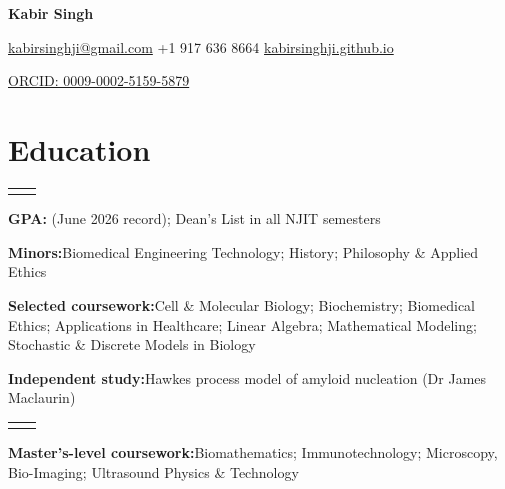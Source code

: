 \documentclass[a4paper,11pt]{article}
\makeatletter
\newcommand{\cvsection}[1]{\Needspace{4\baselineskip}\section*{#1}}
\newcommand{\entry}[4]{%
  \Needspace{4\baselineskip}%
  \begin{tabularx}{\linewidth}{@{}>{\raggedright\arraybackslash}X
    >{\raggedleft\arraybackslash}p{33mm}@{}}%
    \textbf{#1} & {\small #2}\\%
    \multicolumn{2}{@{}p{\linewidth}@{}}{{\small #3\if\relax\detokenize{#4}\relax\else\enspace|\enspace #4\fi}}%
  \end{tabularx}\par
}
\newcommand{\detail}[2]{\textbf{#1}\enspace #2\par}
\newcommand{\gap}{\vspace{3pt}}
\makeatother
\begin{document}
\begin{center}
  {\fontsize{23}{25}\selectfont\bfseries Kabir Singh}\par
  \vspace{3pt}
  {\small
    \href{mailto:kabirsinghji@gmail.com}{kabirsinghji@gmail.com}
    \enspace\textbar\enspace +1 917 636 8664
    \enspace\textbar\enspace
    \href{https://kabirsinghji.github.io}{kabirsinghji.github.io}}\par
  \vspace{1pt}
  {\small \href{https://orcid.org/0009-0002-5159-5879}{ORCID: 0009-0002-5159-5879}}
\end{center}
\vspace{-6pt}


\cvsection{Education}
\entry{B.S. Mathematical Sciences (Mathematical Biology)}
  {Sep 2023 -- May 2027}
  {Albert Dorman Honors College, New Jersey Institute of Technology (NJIT)}
  {Newark, NJ, USA}
{\small
  \detail{GPA:}{3.60 (June 2026 record); Dean's List in all NJIT semesters}
  \detail{Minors:}{Biomedical Engineering Technology; History; Philosophy \& Applied Ethics}
  \detail{Selected coursework:}{Cell \& Molecular Biology; Biochemistry; Biomedical Ethics;
    Applications in Healthcare; Linear Algebra; Mathematical Modeling; Stochastic \& Discrete Models in Biology}
  \detail{Independent study:}{Hawkes process model of amyloid nucleation (Dr James Maclaurin)}
}
\gap
\entry{Exchange semester (Global E3), Lund University}
  {Jan 2025 -- Jun 2025}
  {Faculty of Engineering (LTH); 44 ECTS}{Sweden}
{\small
  \detail{Master's-level coursework:}{Biomathematics; Immunotechnology; Microscopy, Bio-Imaging;
    Ultrasound Physics \& Technology}
}
\end{document}
